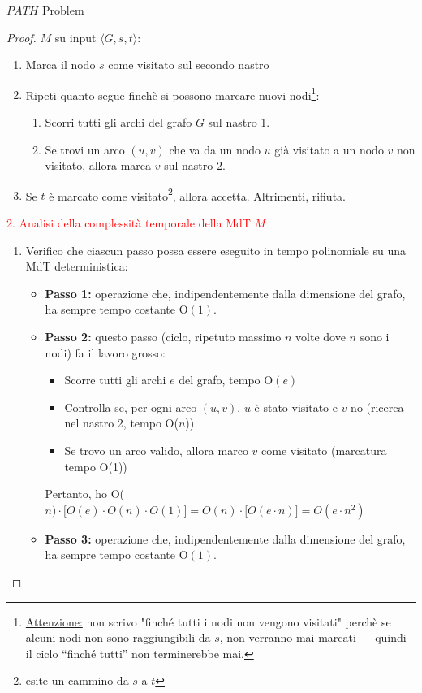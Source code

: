 \documentclass{article}  %
\theoremstyle{definition}
\begin{document}
\begin{theorem}{$PATH$ Problem}
\begin{proof}
		$M$ su input $\langle G, s, t \rangle$:
		\begin{enumerate}
			\item Marca il nodo $s$ come visitato sul secondo nastro
			\item Ripeti quanto segue finchè si possono marcare nuovi nodi\footnote{\underline{Attenzione:} non scrivo "finché tutti i nodi non vengono visitati" perchè
				      se alcuni nodi non sono raggiungibili da $s$, non verranno mai marcati — quindi il ciclo “finché tutti” non terminerebbe mai.}:
			      \begin{enumerate}
				      \item Scorri tutti gli archi del grafo $G$ sul nastro 1.
				      \item Se trovi un arco $(u,v)$ che va da un nodo $u$ già visitato a un nodo $v$ non visitato, allora marca $v$ sul nastro 2.
			      \end{enumerate}
			\item Se $t$ è marcato come visitato\footnote{esite un cammino da $s$ a $t$}, allora accetta. Altrimenti, rifiuta.
		\end{enumerate}
		\textcolor{red}{2. Analisi della complessità temporale della MdT $M$}
		\begin{enumerate}
			\item Verifico che ciascun passo possa essere eseguito in tempo polinomiale su una MdT deterministica:
			      \begin{itemize}
				      \item \textbf{Passo 1:} operazione che, indipendentemente dalla dimensione del grafo, ha sempre tempo costante O$(1)$.
				      \item \textbf{Passo 2:} questo passo (ciclo, ripetuto massimo $n$ volte dove $n$ sono i nodi) fa il lavoro grosso:
				            \begin{itemize}
					            \item Scorre tutti gli archi $e$ del grafo, tempo O$(e)$
					            \item Controlla se, per ogni arco $(u,v)$, $u$ è stato visitato e $v$ no (ricerca nel nastro 2, tempo O($n$))
					            \item Se trovo un arco valido, allora marco $v$ come visitato (marcatura tempo O(1))
				            \end{itemize}
				            Pertanto, ho O($n)\cdot \big[O(e)\cdot O(n)\cdot O(1)\big]=O(n)\cdot \big[O(e \cdot n)\big]=O(e \cdot n^2)$
				      \item \textbf{Passo 3:} operazione che, indipendentemente dalla dimensione del grafo, ha sempre tempo costante O$(1)$.

\end{itemize}
\end{enumerate}
\end{proof}
\end{theorem}
\end{document}
